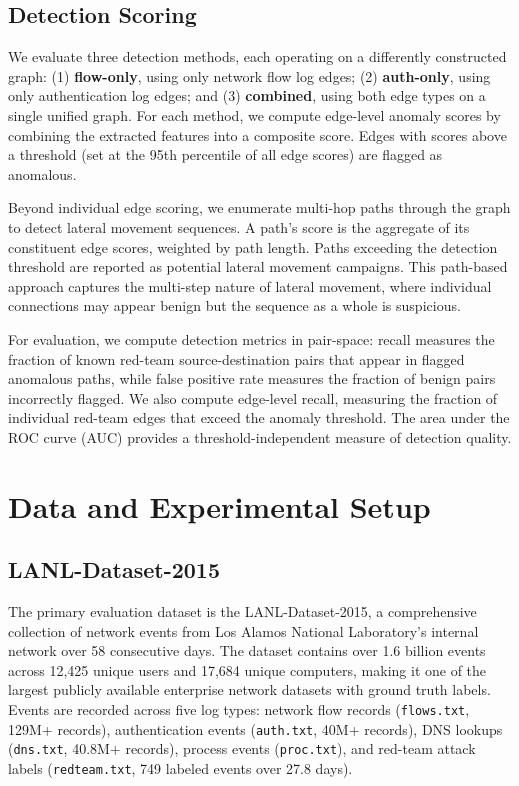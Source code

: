 \documentclass[letterpaper,twocolumn,10pt]{article}
\begin{document}
\subsection{Detection Scoring}

We evaluate three detection methods, each operating on a differently constructed graph: (1) \textbf{flow-only}, using only network flow log edges; (2) \textbf{auth-only}, using only authentication log edges; and (3) \textbf{combined}, using both edge types on a single unified graph. For each method, we compute edge-level anomaly scores by combining the extracted features into a composite score. Edges with scores above a threshold (set at the 95th percentile of all edge scores) are flagged as anomalous.

Beyond individual edge scoring, we enumerate multi-hop paths through the graph to detect lateral movement sequences. A path's score is the aggregate of its constituent edge scores, weighted by path length. Paths exceeding the detection threshold are reported as potential lateral movement campaigns. This path-based approach captures the multi-step nature of lateral movement, where individual connections may appear benign but the sequence as a whole is suspicious.

For evaluation, we compute detection metrics in pair-space: recall measures the fraction of known red-team source-destination pairs that appear in flagged anomalous paths, while false positive rate measures the fraction of benign pairs incorrectly flagged. We also compute edge-level recall, measuring the fraction of individual red-team edges that exceed the anomaly threshold. The area under the ROC curve (AUC) provides a threshold-independent measure of detection quality.

\section{Data and Experimental Setup}

\subsection{LANL-Dataset-2015}

The primary evaluation dataset is the LANL-Dataset-2015, a comprehensive collection of network events from Los Alamos National Laboratory's internal network over 58 consecutive days. The dataset contains over 1.6 billion events across 12,425 unique users and 17,684 unique computers, making it one of the largest publicly available enterprise network datasets with ground truth labels. Events are recorded across five log types: network flow records (\texttt{flows.txt}, 129M+ records), authentication events (\texttt{auth.txt}, 40M+ records), DNS lookups (\texttt{dns.txt}, 40.8M+ records), process events (\texttt{proc.txt}), and red-team attack labels (\texttt{redteam.txt}, 749 labeled events over 27.8 days).
\end{document}
